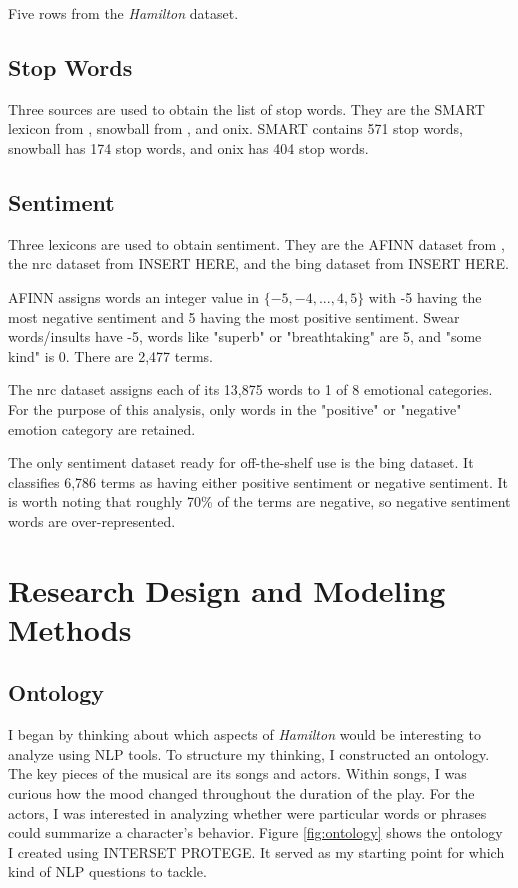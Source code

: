 \documentclass{article}
\begin{document}
\begin{table}
\caption{Five rows from the \emph{Hamilton} dataset.}
\label{tab:example}

\end{table}

\subsection{Stop Words}

Three sources are used to obtain the list of stop words. They are the SMART lexicon from \cite{Lewis2004}, snowball from \cite{snowball}, and onix. SMART contains 571 stop words, snowball has 174 stop words, and onix has 404 stop words.

\subsection{Sentiment}

Three lexicons are used to obtain sentiment. They are the AFINN dataset from \cite{nielsen11}, the nrc dataset from INSERT HERE, and the bing dataset from INSERT HERE.

AFINN assigns words an integer value in $\{-5, -4, ..., 4, 5\}$ with -5 having the most negative sentiment and 5 having the most positive sentiment. Swear words/insults have -5, words like "superb" or "breathtaking" are 5, and "some kind" is 0. There are 2,477 terms. 

The nrc dataset assigns each of its 13,875 words to 1 of 8 emotional categories. For the purpose of this analysis, only words in the "positive" or "negative" emotion category are retained. 

The only sentiment dataset ready for off-the-shelf use is the bing dataset. It classifies 6,786 terms as having either positive sentiment or negative sentiment. It is worth noting that roughly 70\% of the terms are negative, so negative sentiment words are over-represented. 


\section{Research Design and Modeling Methods}

\subsection{Ontology}

I began by thinking about which aspects of \emph{Hamilton} would be interesting to analyze using NLP tools. To structure my thinking, I constructed an ontology. The key pieces of the musical are its songs and actors. Within songs, I was curious how the mood changed throughout the duration of the play. For the actors, I was interested in analyzing whether were particular words or phrases could summarize a character's behavior. Figure \ref{fig:ontology} shows the ontology I created using INTERSET PROTEGE. It served as my starting point for which kind of NLP questions to tackle. 
\end{document}

